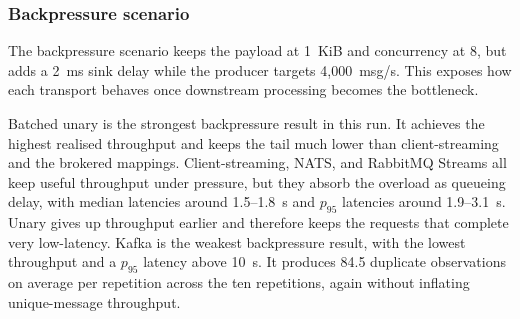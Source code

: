 \subsubsection{Backpressure scenario}

The backpressure scenario keeps the payload at 1~KiB and concurrency at 8, but adds a 2~ms sink delay while the producer targets 4{,}000~msg/s. This exposes how each transport behaves once downstream processing becomes the bottleneck.

\begin{table}[t]
    \centering
    \scriptsize
    \caption{Backpressure scenario: single-node results averaged over ten repetitions (1\,KiB, concurrency 8, 4{,}000 msg/s target, 2\,ms sink delay). Throughput in msg/s; latency, inter-arrival, and jitter values in milliseconds.}
    \label{tab:grpc-backpressure-results}
    \setlength{\tabcolsep}{3pt}
\end{table}

Batched unary is the strongest backpressure result in this run. It achieves the highest realised throughput and keeps the tail much lower than client-streaming and the brokered mappings. Client-streaming, NATS, and RabbitMQ Streams all keep useful throughput under pressure, but they absorb the overload as queueing delay, with median latencies around 1.5--1.8~s and $p_{95}$ latencies around 1.9--3.1~s. Unary gives up throughput earlier and therefore keeps the requests that complete very low-latency. Kafka is the weakest backpressure result, with the lowest throughput and a $p_{95}$ latency above 10~s. It produces 84.5 duplicate observations on average per repetition across the ten repetitions, again without inflating unique-message throughput.

